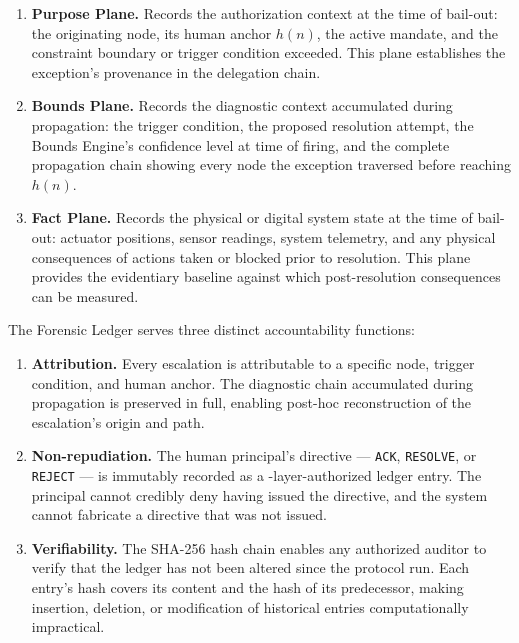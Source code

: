 \begin{enumerate}\itemsep=0pt
\item \textbf{Purpose Plane.} Records the authorization context at the time of bail-out: the originating node, its human anchor $h(n)$, the active mandate, and the constraint boundary or trigger condition exceeded. This plane establishes the exception's provenance in the delegation chain.

\item \textbf{Bounds Plane.} Records the diagnostic context accumulated during propagation: the trigger condition, the proposed resolution attempt, the Bounds Engine's confidence level at time of firing, and the complete propagation chain showing every node the exception traversed before reaching $h(n)$.

\item \textbf{Fact Plane.} Records the physical or digital system state at the time of bail-out: actuator positions, sensor readings, system telemetry, and any physical consequences of actions taken or blocked prior to resolution. This plane provides the evidentiary baseline against which post-resolution consequences can be measured.
\end{enumerate}

The Forensic Ledger serves three distinct accountability functions:

\begin{enumerate}\itemsep=0pt
\item \textbf{Attribution.} Every escalation is attributable to a specific node, trigger condition, and human anchor. The diagnostic chain accumulated during propagation is preserved in full, enabling post-hoc reconstruction of the escalation's origin and path.

\item \textbf{Non-repudiation.} The human principal's directive — \texttt{ACK}, \texttt{RESOLVE}, or \texttt{REJECT} — is immutably recorded as a \purpose-layer-authorized ledger entry. The principal cannot credibly deny having issued the directive, and the system cannot fabricate a directive that was not issued.

\item \textbf{Verifiability.} The SHA-256 hash chain enables any authorized auditor to verify that the ledger has not been altered since the protocol run. Each entry's hash covers its content and the hash of its predecessor, making insertion, deletion, or modification of historical entries computationally impractical.
\end{enumerate}


